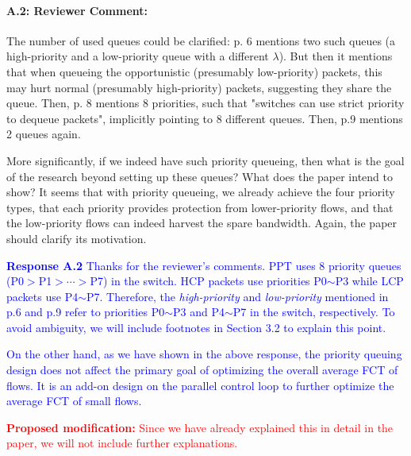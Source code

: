 \documentclass[12pt,one-column]{article}
\begin{document}
{\it \paragraph{A.2: Reviewer Comment:} The number of used queues could be clarified: p. 6 mentions two such queues (a high-priority and a low-priority queue with a different $\lambda$). But then it mentions that when queueing the opportunistic (presumably low-priority) packets, this may hurt normal (presumably high-priority) packets, suggesting they share the queue. Then, p. 8 mentions 8 priorities, such that "switches can use strict priority to dequeue packets", implicitly pointing to 8 different queues. Then, p.9 mentions 2 queues again.
	
More significantly, if we indeed have such priority queueing, then what is the goal of the research beyond setting up these queues? What does the paper intend to show? It seems that with priority queueing, we already achieve the four priority types, that each priority provides protection from lower-priority flows, and that the low-priority flows can indeed harvest the spare bandwidth. Again, the paper should clarify its motivation.}

\noindent\textcolor{blue}{\textbf{Response A.2}
Thanks for the reviewer's comments. 
PPT uses 8 priority queues (P0$>$P1$>\cdots>$P7) in the switch.
HCP packets use priorities P0$\sim$P3 while LCP packets use P4$\sim$P7.
Therefore, the \emph{high-priority} and \emph{low-priority} mentioned in p.6 and p.9 refer to priorities P0$\sim$P3 and P4$\sim$P7 in the switch, respectively.
To avoid ambiguity, we will include footnotes in Section 3.2 to explain this point.
} 

\textcolor{blue}{On the other hand, as we have shown in the above response, the priority queuing design does not affect the primary goal of optimizing the overall average FCT of flows. It is an add-on design on the parallel control loop to further optimize the average FCT of small flows.
}

\noindent\textcolor{red}{\textbf{Proposed modification: }
Since we have already explained this in detail in the paper, we will not include further explanations.
}

\end{document}
